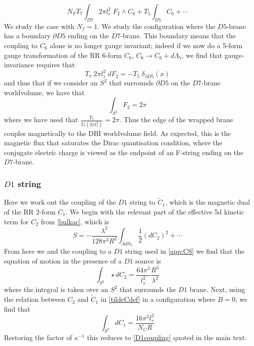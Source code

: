 \documentclass[aps,preprint,nofootinbib,preprintnumbers,eqsecnum,superscriptaddress]{revtex4}
\newcommand\half{{\ensuremath{\frac{1}{2}}}}
\newcommand\p{\ensuremath{\partial}}
\newcommand\lam{\lambda}
\newcommand\ha{{\half}}
\newcommand{\ka}{{\kappa}}
\begin{document}
\begin{appendix}
\begin{equation}
N_{F} T_{7} \int_{D7} 2\pi l_s^2 \; F_{2} \wedge C_{6} + T_{5} \int_{D5} C_{6} + \cdots
\end{equation}
We study the case with $N_f = 1$. We study the configuration where the $D5$-brane has a boundary $\p D5$ ending on the $D7$-brane. This boundary means that the coupling to $C_{6}$ alone is no longer gauge invariant; indeed if we now do a 5-form gauge transformation of the RR 6-form $C_6$,  $C_{6} \to C_{6} + d\Lambda_{5}$, we find that gauge-invariance requires that
\begin{equation}
T_{7} \; 2\pi l_{s}^2 \; d F_{2} = -T_{5} \; \delta_{\p D5}(x)
\end{equation}  
and thus that if we consider an $S^2$ that surrounds $\p D5$ on the $D7$-brane worldvolume, we have that
\begin{equation}
\int_{S^2} F_{2} = 2\pi 
\end{equation}
where we have used that $\frac{T_5}{T_{7} (2\pi l_s^2)} = 2\pi$. Thus the edge of the wrapped brane couples magnetically to the DBI worldvolume field. As expected, this is the magnetic flux that saturates the Dirac quantisation condition, where the conjugate electric charge is viewed as the endpoint of an F-string ending on the $D7$-brane. 

\subsubsection{\texorpdfstring{$D1$}{D1} string}
Here we work out the coupling of the $D1$ string to $\tilde{C}_1$, which is the magnetic dual of the RR 2-form $C_1$.  We begin with the relevant part of the effective 5d kinetic term for $C_2$ from \eqref{bulkac}, which is
\begin{equation}
S = - \frac{\lam^2}{128 \pi^3 R^3} \int_{AdS_{5}} \ha (dC_2)^2 + \cdots
\end{equation}
From here we and the coupling to a $D1$ string used in \ref{app:CS} we find that the equation of motion in the presence of a $D1$ source is
\begin{equation}
\int_{S^2} \star d C_2 = \frac{64 \pi^3}{l_s^2}\frac{R^3}{\lam^2} 
\end{equation}
where the integral is taken over an $S^2$ that surrounds the $D1$ brane. Next, using the relation between $C_2$ and $\tilde{C}_1$ in \eqref{tildeCdef} in a configuration where $B = 0$, we find that
\begin{equation}
\int_{S^2} dC_1 = \frac{16\pi^2 l_s^2}{N_{C} R} 
\end{equation}
Restoring the factor of $\ka^{-1}$ this reduces to \eqref{D1coupling} quoted in the main text. 


\end{appendix}
\end{document}
